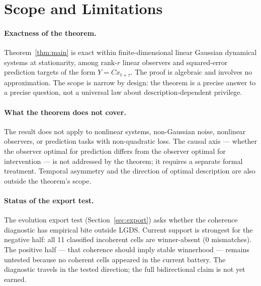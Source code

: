 \documentclass[11pt]{article}
\begin{document}

\section{Scope and Limitations}
\label{sec:scope}

\paragraph{Exactness of the theorem.}
Theorem~\ref{thm:main} is exact within finite-dimensional linear Gaussian
dynamical systems at stationarity, among rank-$r$ linear observers and
squared-error prediction targets of the form $Y = Cx_{t+\tau}$.
The proof is algebraic and involves no approximation.
The scope is narrow by design: the theorem is a precise answer to a precise
question, not a universal law about description-dependent privilege.

\paragraph{What the theorem does not cover.}
The result does not apply to nonlinear systems, non-Gaussian noise,
nonlinear observers, or prediction tasks with non-quadratic loss.
The causal axis --- whether the observer optimal for prediction differs from
the observer optimal for intervention --- is not addressed by the theorem;
it requires a separate formal treatment.
Temporal asymmetry and the direction of optimal description are also outside
the theorem's scope.

\paragraph{Status of the export test.}
The evolution export test (Section~\ref{sec:export}) asks whether the
coherence diagnostic has empirical bite outside LGDS.
Current support is strongest for the negative half:
all 11 classified incoherent cells are winner-absent (0 mismatches).
The positive half --- that coherence should imply stable winnerhood ---
remains untested because no coherent cells appeared in the current battery.
The diagnostic travels in the tested direction; the full bidirectional claim
is not yet earned.
\end{document}
